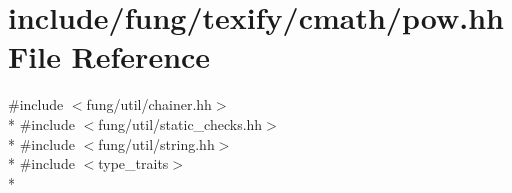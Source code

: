 \hypertarget{texify_2cmath_2pow_8hh}{\section{include/fung/texify/cmath/pow.hh File Reference}
\label{texify_2cmath_2pow_8hh}
}
{\ttfamily \#include $<$fung/util/chainer.\-hh$>$}\\*
{\ttfamily \#include $<$fung/util/static\-\_\-checks.\-hh$>$}\\*
{\ttfamily \#include $<$fung/util/string.\-hh$>$}\\*
{\ttfamily \#include $<$type\-\_\-traits$>$}\\*

